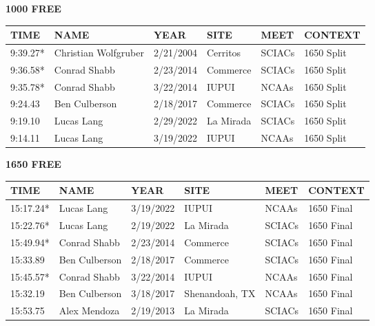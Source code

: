 \vspace{0.4cm}

\begin{minipage}[t]{0.48\textwidth}
\centering
\textbf{1000 FREE}\\[0.05cm]
\begin{tabular}{@{}p{1.8cm}p{2.8cm}p{1.2cm}p{1.4cm}p{1.4cm}p{2.0cm}@{}}
\hline
\textbf{TIME} & \textbf{NAME} & \textbf{YEAR} & \textbf{SITE} & \textbf{MEET} & \textbf{CONTEXT} \\
\hline
9:39.27* & Christian Wolfgruber & 2/21/2004 & Cerritos & SCIACs & 1650 Split \\
9:36.58* & Conrad Shabb & 2/23/2014 & Commerce & SCIACs & 1650 Split \\
9:35.78* & Conrad Shabb & 3/22/2014 & IUPUI & NCAAs & 1650 Split \\
9:24.43 & Ben Culberson & 2/18/2017 & Commerce & SCIACs & 1650 Split \\
9:19.10 & Lucas Lang & 2/29/2022 & La Mirada & SCIACs & 1650 Split \\
9:14.11 & Lucas Lang & 3/19/2022 & IUPUI & NCAAs & 1650 Split \\
\hline
\end{tabular}
\end{minipage}\hfill
\begin{minipage}[t]{0.48\textwidth}
\centering
\textbf{1650 FREE}\\[0.05cm]
\begin{tabular}{@{}p{1.8cm}p{2.8cm}p{1.2cm}p{1.4cm}p{1.4cm}p{2.0cm}@{}}
\hline
\textbf{TIME} & \textbf{NAME} & \textbf{YEAR} & \textbf{SITE} & \textbf{MEET} & \textbf{CONTEXT} \\
\hline
15:17.24* & Lucas Lang & 3/19/2022 & IUPUI & NCAAs & 1650 Final \\
15:22.76* & Lucas Lang & 2/19/2022 & La Mirada & SCIACs & 1650 Final \\
15:49.94* & Conrad Shabb & 2/23/2014 & Commerce & SCIACs & 1650 Final \\
15:33.89 & Ben Culberson & 2/18/2017 & Commerce & SCIACs & 1650 Final \\
15:45.57* & Conrad Shabb & 3/22/2014 & IUPUI & NCAAs & 1650 Final \\
15:32.19 & Ben Culberson & 3/18/2017 & Shenandoah, TX & NCAAs & 1650 Final \\
15:53.75 & Alex Mendoza & 2/19/2013 & La Mirada & SCIACs & 1650 Final \\
\hline
\end{tabular}
\end{minipage}

